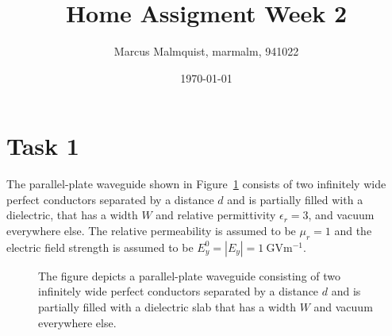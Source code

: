 \documentclass{article}
\title{Home Assigment Week 2}
\author{Marcus Malmquist, marmalm, 941022}
\date{\today}
\begin{document}
\maketitle

\section{Task 1}
The parallel-plate waveguide shown in Figure~\ref{fig:prob} consists of two infinitely wide perfect conductors separated by a distance $d$ and is partially filled with a dielectric, that has a width $W$ and relative permittivity $\epsilon_r=3$, and vacuum everywhere else. The relative permeability is assumed to be $\mu_r=1$ and the electric field strength is assumed to be $E^0_y=|E_y|=\SI{1}{\giga\volt\metre^{-1}}$.
\begin{figure}
  \centering
  \noindent\makebox[\textwidth]{\scalebox{0.9}{}}
  \caption{The figure depicts a parallel-plate waveguide consisting of two infinitely wide perfect conductors separated by a distance $d$ and is partially filled with a dielectric slab that has a width $W$ and vacuum everywhere else.}
  \label{fig:prob}
\end{figure}
\end{document}
